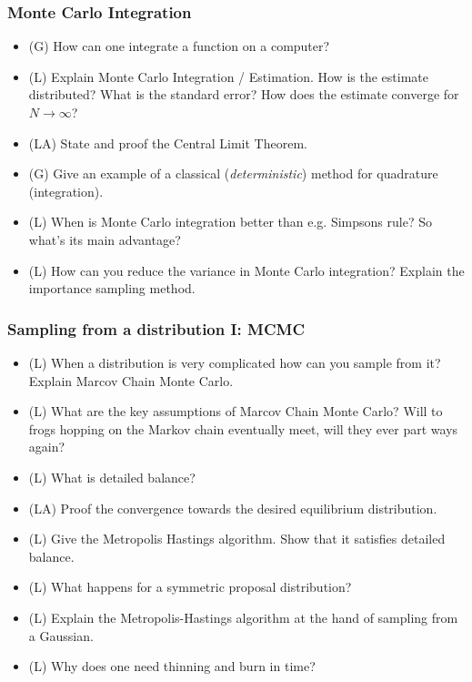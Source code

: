 \subsubsection*{Monte Carlo Integration}
\begin{itemize}
    \item (G) How can one integrate a function on a computer?
    \item (L) Explain Monte Carlo Integration / Estimation. How is the estimate distributed? What is the standard error? How does the estimate converge for $N \rightarrow \infty$?
    \item (LA) State and proof the Central Limit Theorem.
    \item (G) Give an example of a classical (\textit{deterministic}) method for quadrature (integration).
    \item (L) When is Monte Carlo integration better than e.g. Simpsons rule? So what's its main advantage?
    \item (L) How can you reduce the variance in Monte Carlo integration? Explain the importance sampling method.
\end{itemize}

\subsubsection*{Sampling from a distribution I: MCMC}

\begin{itemize}
    \item (L) When a distribution is very complicated how can you sample from it? Explain Marcov Chain Monte Carlo.
    \item (L) What are the key assumptions of Marcov Chain Monte Carlo? Will to frogs hopping on the Markov chain eventually meet, will they ever part ways again?
    \item (L) What is detailed balance?
    \item (LA) Proof the convergence towards the desired equilibrium distribution.
    \item (L) Give the Metropolis Hastings algorithm. Show that it satisfies detailed balance.
    \item (L) What happens for a symmetric proposal distribution?
    \item (L) Explain the Metropolis-Hastings algorithm at the hand of sampling from a Gaussian.
    \item (L) Why does one need thinning and burn in time?
\end{itemize}

